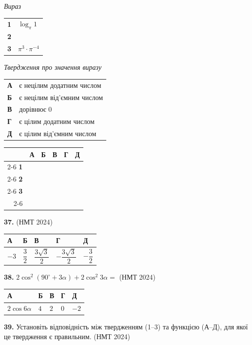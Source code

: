 \documentclass[14pt]{extarticle}
\newcommand{\answerTableTall}[5]{
\begin{center}
\begin{tabular}{|*{5}{>{\centering\arraybackslash}m{2.8cm}|}}
\hline
\rule[-0.3cm]{0pt}{0.8cm}\textbf{А} & \textbf{Б} & \textbf{В} & \textbf{Г} & \textbf{Д} \\
\hline
\rule[-0.9cm]{0pt}{2.0cm}#1 & 
\rule[-0.9cm]{0pt}{2.0cm}#2 & 
\rule[-0.9cm]{0pt}{2.0cm}#3 & 
\rule[-0.9cm]{0pt}{2.0cm}#4 & 
\rule[-0.9cm]{0pt}{2.0cm}#5 \\
\hline
\end{tabular}
\end{center}
}
\newcommand{\answerGrid}{
    \begingroup
    \renewcommand{\arraystretch}{1.3} 
    \setlength{\tabcolsep}{7pt} 
    \begin{tabular}{r|c|c|c|c|c|}
         \multicolumn{1}{c}{} & \multicolumn{1}{c}{\textbf{А}} & \multicolumn{1}{c}{\textbf{Б}} & \multicolumn{1}{c}{\textbf{В}} & \multicolumn{1}{c}{\textbf{Г}} & \multicolumn{1}{c}{\textbf{Д}} \\ \cline{2-6}
         \textbf{1} & & & & & \\ \cline{2-6}
         \textbf{2} & & & & & \\ \cline{2-6}
         \textbf{3} & & & & & \\ \cline{2-6}
    \end{tabular}
    \endgroup
}
\newcommand{\matchingLayout}[3]{
    \noindent
    \begin{minipage}[t]{0.40\textwidth}
       
        #1
    \end{minipage}%
    \hfill
    \begin{minipage}[t]{0.28\textwidth}
        
        #2
    \end{minipage}%
    \hfill
    \begin{minipage}[t]{0.30\textwidth}
        \vspace{0pt} %
        \begin{flushright}
        #3
        \end{flushright}
    \end{minipage}
}
\newcommand{\nmtyear}[1]{\hfill{\small\color{yearcolor}(НМТ #1)}}
\begin{document}
\matchingLayout{
    \textit{Вираз} \par \vspace{0.2cm}
    \begin{tabular}{@{}p{0.5cm} l@{}}
    \textbf{1} & $\log_{\pi} 1$ \\[0.4cm]
    \textbf{2} & \trigStyle{$\sin \left(-\dfrac{\pi}{6}\right)$} \\[0.4cm]
    \textbf{3} & $\pi^3 \cdot \pi^{-4}$ \\
    \end{tabular}
}{
    \textit{Твердження про значення виразу} \par \vspace{0.2cm}
    \begin{tabular}{@{}p{0.3cm} p{5cm}@{}}
    \textbf{А} & є нецілим додатним числом \\[0.2cm]
    \textbf{Б} & є нецілим від'ємним числом \\[0.2cm]
    \textbf{В} & дорівнює 0 \\[0.2cm]
    \textbf{Г} & є цілим додатним числом \\[0.2cm]
    \textbf{Д} & є цілим від'ємним числом \\
    \end{tabular}
}{
    \answerGrid
}

\vspace{0.7cm}

\noindent\textbf{37.}  \nmtyear{2024}

\vspace{0.3cm}
\answerTableTall{$-3$}{$\dfrac{3}{2}$}{$\dfrac{3\sqrt{3}}{2}$}{$-\dfrac{3\sqrt{3}}{2}$}{$-\dfrac{3}{2}$}

\noindent\textbf{38.} $2\cos^2 (90^\circ + 3\alpha) + 2\cos^2 3\alpha =$ \nmtyear{2024}

\vspace{0.3cm}
\answerTableTall{$2\cos 6\alpha$}{$4$}{$2$}{$0$}{$-2$}

\vspace{0.7cm}

\noindent\textbf{39.} Установіть відповідність між твердженням (1--3) та функцією (А--Д), для якої це твердження є правильним. \nmtyear{2024}

\vspace{0.3cm}
\end{document}
